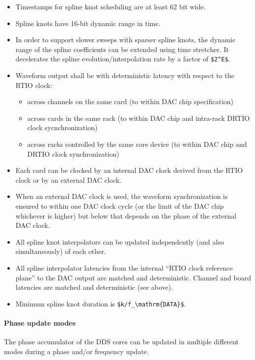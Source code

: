 \begin{itemize}
	\item
	Timestamps for spline knot scheduling are at least 62 bit wide.
	\item
	Spline knots have 16-bit dynamic range in time.
	\item
	In order to support slower sweeps with sparser spline knots, the
	dynamic range of the spline coefficients can be extended using time
	stretcher. It decelerates the spline evolution/interpolation rate by a
	factor of \texttt{\$2\^{}E\$}.
	\item
	Waveform output shall be with deterministic latency with respect to
	the RTIO clock:
	
	\begin{itemize}
		\item
		across channels on the same card (to within DAC chip specification)
		\item
		across cards in the same rack (to within DAC chip and intra-rack
		DRTIO clock sycnchronization)
		\item
		across racks controlled by the same core device (to within DAC chip
		and DRTIO clock synchronization)
	\end{itemize}
	\item
	Each card can be clocked by an internal DAC clock derived from the
	RTIO clock or by an external DAC clock.
	\item
	When an external DAC clock is used, the waveform synchronization is
	ensured to within one DAC clock cycle (or the limit of the DAC chip
	whichever is higher) but below that depends on the phase of the
	external DAC clock.
	\item
	All spline knot interpolators can be updated independently (and also
	simultaneously) of each other.
	\item
	All spline interpolator latencies from the internal ``RTIO clock
	reference plane'' to the DAC output are matched and deterministic.
	Channel and board latencies are matched and deterministic (see above).
	\item
	Minimum spline knot duration is
	\texttt{\$k/f\_\textbackslash{}mathrm\{DATA\}\$}.
\end{itemize}

\paragraph{Phase update modes}\label{phase-update-modes}

The phase accumulator of the DDS cores can be updated in multiple
different modes during a phase and/or frequency update.

